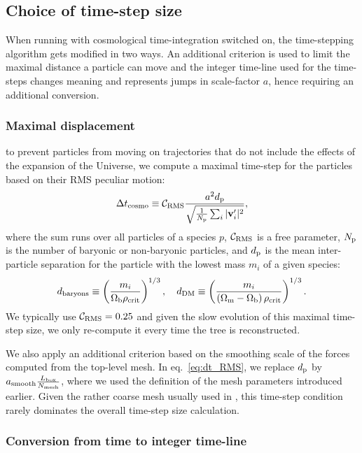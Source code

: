 \subsection{Choice of time-step size}
\label{ssec:timesteps}

When running \swift with cosmological time-integration switched on, the
time-stepping algorithm gets modified in two ways. An additional criterion is
used to limit the maximal distance a particle can move and the integer time-line
used for the time-steps changes meaning and represents jumps in scale-factor $a$, 
hence requiring an additional conversion.

\subsubsection{Maximal displacement}

to prevent particles from moving on trajectories that do not include the effects
of the expansion of the Universe, we compute a maximal time-step for the
particles based on their RMS peculiar motion:
\begin{equation}
  \Delta t_{\rm cosmo} \equiv \mathcal{C}_{\rm RMS} \frac{a^2 d_{\rm p}}{\sqrt{\frac{1}{N_{\rm p}}\sum_i | \mathbf{v}_i' |^2}},
  \label{eq:dt_RMS}
\end{equation}
where the sum runs over all particles of a species $p$, $\mathcal{C}_{\rm RMS}$
is a free parameter, $N_{\rm p}$ is the number of baryonic or non-baryonic
particles, and $d_{\rm p}$ is the mean inter-particle separation for the
particle with the lowest mass $m_i$ of a given species:
\begin{equation}
  d_{\rm baryons} \equiv \left(\frac{m_i}{\Omega_{\rm b} \rho_{\rm crit}}\right)^{1/3}, \quad d_{\rm DM} \equiv \left(\frac{m_i}{\left(\Omega_{\rm m} - \Omega_{\rm b}\right) \rho_{\rm crit}}\right)^{1/3}.
  \nonumber
\end{equation}
We typically use $\mathcal{C}_{\rm RMS} = 0.25$ and given the slow evolution of
this maximal time-step size, we only re-compute it every time the tree is
reconstructed.

We also apply an additional criterion based on the smoothing scale of the forces
computed from the top-level mesh.  In eq.~\ref{eq:dt_RMS}, we replace
$d_{\rm p}$ by $a_{\rm smooth} \frac{L_{\rm box}}{N_{\rm mesh}}$, where we used
the definition of the mesh parameters introduced earlier. Given the rather
coarse mesh usually used in \swift, this time-step condition rarely dominates
the overall time-step size calculation.

\subsubsection{Conversion from time to integer time-line} 

